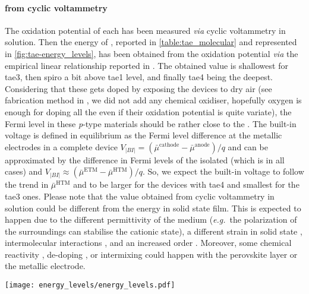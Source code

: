 	\paragraph{ from cyclic voltammetry}
	The oxidation potential of each  has been measured \textsl{via} cyclic voltammetry in solution.
	Then the energy of , reported in \cref{table:tae_molecular} and represented in \cref{fig:tae-energy_levels}, has been obtained from the oxidation potential \textsl{via} the empirical linear relationship reported in .
	The obtained  value is shallowest for \gls{tae3}, then \gls{spiro} a bit above \gls{tae1} level, and finally \gls{tae4} being the deepest.
	Considering that these  gets doped by exposing the devices to dry air (see fabrication method in , we did not add any chemical oxidiser, hopefully oxygen is enough for doping all the  even if their oxidation potential is quite variate), the Fermi level in these \textit{p}-type materials should be rather close to the .
	The built-in voltage is defined in equilibrium as the Fermi level difference at the metallic electrodes in a complete device $V_|BI| = (\bar\mu^{\mathrm{cathode}} - \bar\mu^{\mathrm{anode}})/q$ and can be approximated by the difference in Fermi levels of the isolated  (which is  in all cases) and  $V_|BI| \approx (\bar\mu^{\mathrm{ETM}} - \bar\mu^{\mathrm{HTM}})/q$.
	So, we expect the built-in voltage to follow the trend in $\bar\mu^{\mathrm{HTM}}$ and to be larger for the devices with \gls{tae4} and smallest for the \gls{tae3} ones.
	Please note that the value obtained from cyclic voltammetry in solution could be different from the  energy in solid state film.
	This is expected to happen due to the different permittivity of the medium (\textsl{e.g.}\ the polarization of the surroundings can stabilise the cationic state), a different strain in solid state \cite{Wei2012a}, intermolecular interactions \cite{Kashimoto2018}, and an increased order \cite{Shao2016}.
	Moreover, some chemical reactivity \cite{Carrillo2016,Kim2016a}, de-doping \cite{Kim2017}, or intermixing \cite{Domanski2016} could happen with the perovskite layer or the metallic electrode.

	\begin{SCfigure}
		\centering
		\texttt{[image: energy\_levels/energy\_levels.pdf]}
		\label{fig:tae-energy_levels}
	\end{SCfigure}

